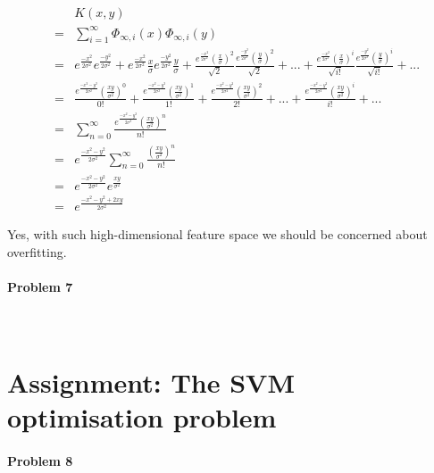 \documentclass{article}
\begin{document}
\begin{eqnarray}
&&K(x,y)\\
&=& \sum_{i=1}^{\infty} \Phi_{\infty,i}(x) \Phi_{\infty,i}(y)\\
&=& e^{\frac{-x^2}{2\sigma^2}}e^{\frac{-y^2}{2\sigma^2}} + e^{\frac{-x^2}{2\sigma^2}}\frac{x}{\sigma}e^{\frac{-y^2}{2\sigma^2}}\frac{y}{\sigma} + \frac{e^{\frac{-x^2}{2\sigma^2}}\left(\frac{x}{\sigma}\right)^2}{\sqrt{2}}\frac{e^{\frac{-y^2}{2\sigma^2}}\left(\frac{y}{\sigma}\right)^2}{\sqrt{2}}+...+ \frac{e^{\frac{-x^2}{2\sigma^2}}\left(\frac{x}{\sigma}\right)^i}{\sqrt{i!}}\frac{e^{\frac{-y^2}{2\sigma^2}}\left(\frac{y}{\sigma}\right)^i}{\sqrt{i!}}+...\\
&=& \frac{e^{\frac{-x^2-y^2}{2\sigma^2}}\left( \frac{xy}{\sigma^2} \right)^0}{0!} + \frac{e^{\frac{-x^2-y^2}{2\sigma^2}}\left( \frac{xy}{\sigma^2} \right)^1}{1!} + \frac{e^{\frac{-x^2-y^2}{2\sigma^2}}\left( \frac{xy}{\sigma^2} \right)^2}{2!} + ... + \frac{e^{\frac{-x^2-y^2}{2\sigma^2}}\left( \frac{xy}{\sigma^2} \right)^i}{i!} + ...\\
&=& \sum_{n = 0}^{\infty} \frac{e^{\frac{-x^2-y^2}{2\sigma^2}}\left( \frac{xy}{\sigma^2} \right)^n}{n!}\\
&=& e^{\frac{-x^2-y^2}{2\sigma^2}} \sum_{n = 0}^{\infty} \frac{\left( \frac{xy}{\sigma^2} \right)^n}{n!}\\ 
&=& e^{\frac{-x^2-y^2}{2\sigma^2}} e^{\frac{xy}{\sigma^2}}\\
&=& e^{\frac{-x^2-y^2+2xy}{2\sigma^2}}
\end{eqnarray}

Yes, with such high-dimensional feature space we should be concerned about overfitting.

\paragraph*{Problem 7}
$\;$ 



\section{Assignment: The SVM optimisation problem}
\paragraph*{Problem 8}
$\;$ 
\end{document}
